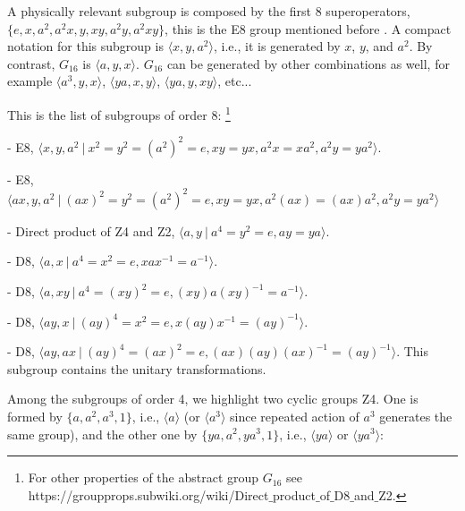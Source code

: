 {A physically relevant subgroup is composed by  the first 8 superoperators, \linebreak $\{e, x, a^{2}, a^{2}x, y, xy, a^{2}y, a^{2}xy\}$, this is the E8 group mentioned before \cite{Simon2019a}.
A compact notation for this subgroup is $\langle x, y, a^2 \rangle$, i.e.,
it is generated by $x$, $y$, and $a^2$. By contrast,  $G_{16}$ is $\langle a,y,x\rangle$.
$G_{16}$ can be generated by other combinations as well, for example $\langle a^3,y,x\rangle$,  $\langle ya,x,y\rangle$, $\langle ya, y, xy\rangle$, etc...



This is the list of subgroups of order 8: \footnote{For other  properties of the abstract group $G_{16}$ see\\
https://groupprops.subwiki.org/wiki/Direct$\_$product$\_$of$\_$D8$\_$and$\_$Z2.}


- E8, $\langle  x, y, a^{2} \ | \ x^{2}=y^{2}=(a^{2})^{2}=e, xy=yx, a^{2}x=xa^{2}, a^{2}y=ya^{2} \rangle$.

- E8, $\langle  ax, y, a^{2} \ | \ (ax)^{2}=y^{2}=(a^{2})^{2}=e, xy=yx, a^{2}(ax)=(ax)a^{2}, a^{2}y=ya^{2} \rangle$

- Direct product of Z4 and Z2, $\langle  a, y \ | \ a^{4}=y^{2}=e, ay=ya \rangle$.

- D8, $\langle a,x \ | \ a^{4}=x^{2}=e, xax^{-1}=a^{-1} \rangle$.

- D8, $\langle a,xy \ | \ a^{4}=(xy)^{2}=e, (xy)a(xy)^{-1}=a^{-1} \rangle$.

- D8, $\langle ay,x \ | \ (ay)^{4}=x^{2}=e, x(ay)x^{-1}=(ay)^{-1} \rangle$.

- D8, $\langle ay,ax \ | \ (ay)^{4}=(ax)^{2}=e, (ax)(ay)(ax)^{-1}=(ay)^{-1} \rangle$. This subgroup contains the unitary transformations.



Among the subgroups of order 4, we highlight  two cyclic groups Z4.
One is formed by  $\{a, a^2, a^3, 1\}$, i.e., $\langle a\rangle$ (or  $\langle a^3\rangle$ since repeated action of $a^3$ generates the same group), and the other one by
$\{ya, a^2, ya^3, 1\}$, i.e., $\langle ya \rangle$ or   $\langle ya^3\rangle$:

}
